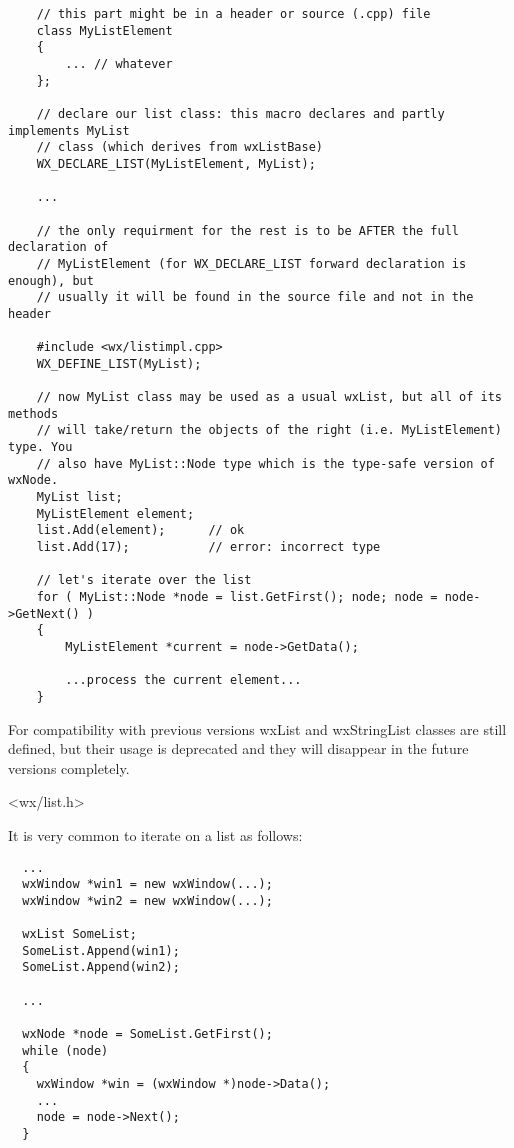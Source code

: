 {\small%
\begin{verbatim}
    // this part might be in a header or source (.cpp) file
    class MyListElement
    {
        ... // whatever
    };

    // declare our list class: this macro declares and partly implements MyList
    // class (which derives from wxListBase)
    WX_DECLARE_LIST(MyListElement, MyList);

    ...

    // the only requirment for the rest is to be AFTER the full declaration of
    // MyListElement (for WX_DECLARE_LIST forward declaration is enough), but
    // usually it will be found in the source file and not in the header

    #include <wx/listimpl.cpp>
    WX_DEFINE_LIST(MyList);

    // now MyList class may be used as a usual wxList, but all of its methods
    // will take/return the objects of the right (i.e. MyListElement) type. You
    // also have MyList::Node type which is the type-safe version of wxNode.
    MyList list;
    MyListElement element;
    list.Add(element);      // ok
    list.Add(17);           // error: incorrect type

    // let's iterate over the list
    for ( MyList::Node *node = list.GetFirst(); node; node = node->GetNext() )
    {
        MyListElement *current = node->GetData();

        ...process the current element...
    }
\end{verbatim}
}

For compatibility with previous versions wxList and wxStringList classes are
still defined, but their usage is deprecated and they will disappear in the
future versions completely.




<wx/list.h>


It is very common to iterate on a list as follows:

\begin{verbatim}
  ...
  wxWindow *win1 = new wxWindow(...);
  wxWindow *win2 = new wxWindow(...);

  wxList SomeList;
  SomeList.Append(win1);
  SomeList.Append(win2);

  ...

  wxNode *node = SomeList.GetFirst();
  while (node)
  {
    wxWindow *win = (wxWindow *)node->Data();
    ...
    node = node->Next();
  }
\end{verbatim}

